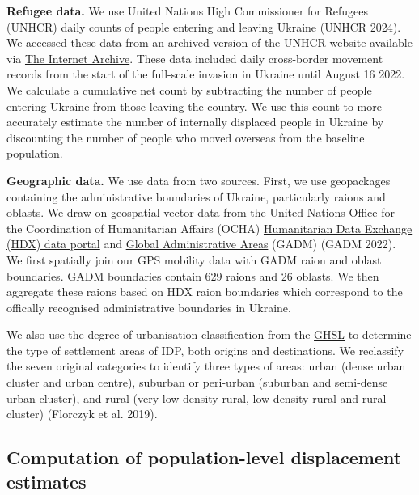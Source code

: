 \documentclass[
  sn-nature,
  11pt,
]{sn-jnl}
\begin{document}
\textbf{Refugee data.} We use United Nations High Commissioner for
Refugees (UNHCR) daily counts of people entering and leaving Ukraine
(UNHCR 2024). We accessed these data from an archived version of the
UNHCR website available via \href{https://web.archive.org/}{The Internet
Archive}. These data included daily cross-border movement records from
the start of the full-scale invasion in Ukraine until August 16 2022. We
calculate a cumulative net count by subtracting the number of people
entering Ukraine from those leaving the country. We use this count to
more accurately estimate the number of internally displaced people in
Ukraine by discounting the number of people who moved overseas from the
baseline population.

\textbf{Geographic data.} We use data from two sources. First, we use
geopackages containing the administrative boundaries of Ukraine,
particularly raions and oblasts. We draw on geospatial vector data from
the United Nations Office for the Coordination of Humanitarian Affairs
(OCHA) \href{https://data.humdata.org/dataset?}{Humanitarian Data
Exchange (HDX) data portal} and \href{https://gadm.org/}{Global
Administrative Areas} (GADM) (GADM 2022). We first spatially join our
GPS mobility data with GADM raion and oblast boundaries. GADM boundaries
contain 629 raions and 26 oblasts. We then aggregate these raions based
on HDX raion boundaries which correspond to the offically recognised
administrative boundaries in Ukraine.

We also use the degree of urbanisation classification from the
\href{https://human-settlement.emergency.copernicus.eu/}{GHSL} to
determine the type of settlement areas of IDP, both origins and
destinations. We reclassify the seven original categories to identify
three types of areas: urban (dense urban cluster and urban centre),
suburban or peri-urban (suburban and semi-dense urban cluster), and
rural (very low density rural, low density rural and rural cluster)
(Florczyk et al. 2019).

\subsection{Computation of population-level displacement
estimates}\label{sec-methods2.2}
\end{document}
